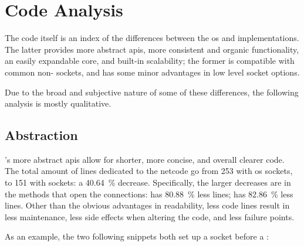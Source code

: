 \chapter{Code Analysis}\label{ch:code}

The code itself is an index of the differences between the \gls{os} and  implementations. The latter provides more abstract \glspl{api}, more consistent and organic functionality, an easily expandable core, and built-in scalability; the former is compatible with common non- sockets, and has some minor advantages in low level socket options.

Due to the broad and subjective nature of some of these differences, the following analysis is mostly qualitative.

\section{Abstraction}\label{sc:code:abstraction}

's more abstract \glspl{api} allow for shorter, more concise, and overall clearer code. The total amount of lines dedicated to the \gls{netcode} go from \num{253} with \gls{os} sockets, to \num{151} with  sockets: a \SI{40,64}{\percent} decrease. Specifically, the larger decreases are in the methods that open the connections:  has \SI{80,88}{\percent} less lines;  has \SI{82,86}{\percent} less lines. Other than the obvious advantages in readability, less code lines result in less maintenance, less side effects when altering the code, and less failure points.



As an example, the two following snippets both set up a socket before a :

